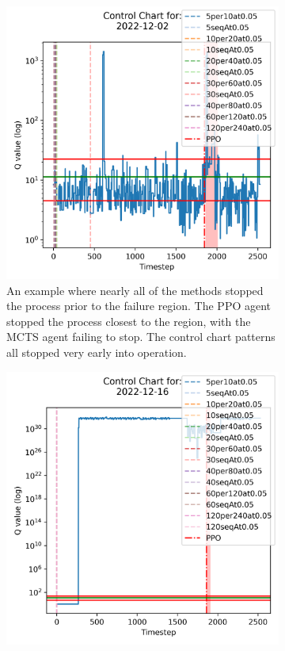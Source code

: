 \documentclass[12pt]{article}
\begin{document}
\begin{figure}[ht!]
    \centering
    \begin{subfigure}[b]{0.475\textwidth}
        \centering
        \includegraphics[width=\textwidth]{assets/spc/blood-refrigerator/T-sq-cchart-2022-12-02.png}
        \caption{{\small An example where nearly all of the methods stopped the process prior to the failure region. The PPO agent stopped the process closest to the region, with the MCTS agent failing to stop. The control chart patterns all stopped very early into operation.}}
    \end{subfigure}
    \hfill
    \begin{subfigure}[b]{0.475\textwidth}
        \centering
        \includegraphics[width=\textwidth]{assets/spc/blood-refrigerator/T-sq-cchart-2022-12-16.png}

\end{subfigure}
\end{figure}
\end{document}
